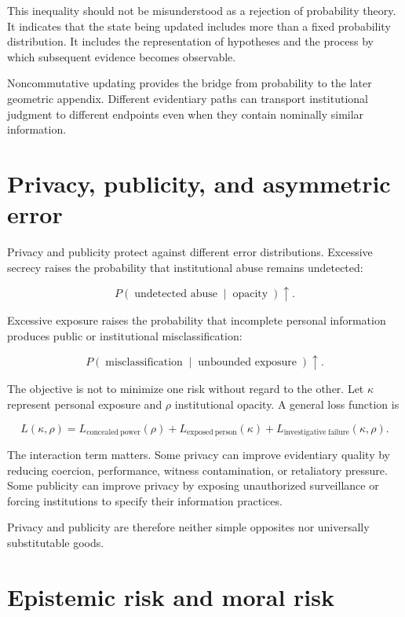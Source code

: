 This inequality should not be misunderstood as a rejection of probability theory. It indicates that the state being updated includes more than a fixed probability distribution. It includes the representation of hypotheses and the process by which subsequent evidence becomes observable.

Noncommutative updating provides the bridge from probability to the later geometric appendix. Different evidentiary paths can transport institutional judgment to different endpoints even when they contain nominally similar information.

\section{Privacy, publicity, and asymmetric error}
\label{sec:a62}

Privacy and publicity protect against different error distributions. Excessive secrecy raises the probability that institutional abuse remains undetected:

\[
P(\operatorname{undetected\ abuse}\mid \operatorname{opacity})
\uparrow.
\]

Excessive exposure raises the probability that incomplete personal information produces public or institutional misclassification:

\[
P(\operatorname{misclassification}\mid \operatorname{unbounded\ exposure})
\uparrow.
\]

The objective is not to minimize one risk without regard to the other. Let \(\kappa\) represent personal exposure and \(\rho\) institutional opacity. A general loss function is

\[
L(\kappa,\rho)
=
L_{\mathrm{concealed\ power}}(\rho)
+
L_{\mathrm{exposed\ person}}(\kappa)
+
L_{\mathrm{investigative\ failure}}(\kappa,\rho).
\]

The interaction term matters. Some privacy can improve evidentiary quality by reducing coercion, performance, witness contamination, or retaliatory pressure. Some publicity can improve privacy by exposing unauthorized surveillance or forcing institutions to specify their information practices.

Privacy and publicity are therefore neither simple opposites nor universally substitutable goods.

\section{Epistemic risk and moral risk}
\label{sec:a63}


